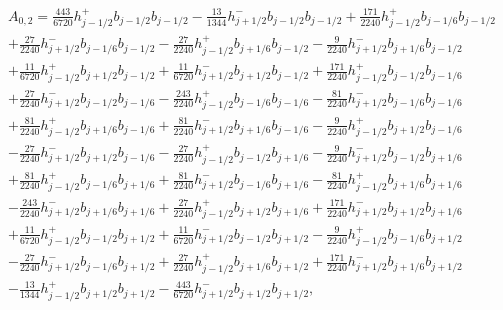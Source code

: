 \documentclass[12pt]{article}
\begin{document}
\begin{multline*} A_{0,2} = \frac{443}{6720} h_{j-1/2}^+ b_{j-1/2} b_{j-1/2}-\frac{13}{1344} h_{j+1/2}^- b_{j-1/2} b_{j-1/2}+\frac{171}{2240} h_{j-1/2}^+ b_{j-1/6} b_{j-1/2}\\+\frac{27}{2240} h_{j+1/2}^- b_{j-1/6} b_{j-1/2}-\frac{27}{2240} h_{j-1/2}^+ b_{j+1/6} b_{j-1/2}-\frac{9}{2240} h_{j+1/2}^- b_{j+1/6} b_{j-1/2}\\+\frac{11}{6720} h_{j-1/2}^+ b_{j+1/2} b_{j-1/2}+\frac{11}{6720} h_{j+1/2}^- b_{j+1/2} b_{j-1/2}+\frac{171}{2240} h_{j-1/2}^+ b_{j-1/2} b_{j-1/6}\\+\frac{27}{2240} h_{j+1/2}^- b_{j-1/2} b_{j-1/6}-\frac{243}{2240} h_{j-1/2}^+ b_{j-1/6} b_{j-1/6}-\frac{81}{2240} h_{j+1/2}^- b_{j-1/6} b_{j-1/6}\\+\frac{81}{2240} h_{j-1/2}^+ b_{j+1/6} b_{j-1/6}+\frac{81}{2240} h_{j+1/2}^- b_{j+1/6} b_{j-1/6}-\frac{9}{2240} h_{j-1/2}^+ b_{j+1/2} b_{j-1/6}\\-\frac{27}{2240} h_{j+1/2}^- b_{j+1/2} b_{j-1/6}-\frac{27}{2240} h_{j-1/2}^+ b_{j-1/2} b_{j+1/6}-\frac{9}{2240} h_{j+1/2}^- b_{j-1/2} b_{j+1/6}\\+\frac{81}{2240} h_{j-1/2}^+ b_{j-1/6} b_{j+1/6}+\frac{81}{2240} h_{j+1/2}^- b_{j-1/6} b_{j+1/6}-\frac{81}{2240} h_{j-1/2}^+ b_{j+1/6} b_{j+1/6}\\-\frac{243}{2240} h_{j+1/2}^- b_{j+1/6} b_{j+1/6}+\frac{27}{2240} h_{j-1/2}^+ b_{j+1/2} b_{j+1/6}+\frac{171}{2240} h_{j+1/2}^- b_{j+1/2} b_{j+1/6}\\+\frac{11}{6720} h_{j-1/2}^+ b_{j-1/2} b_{j+1/2}+\frac{11}{6720} h_{j+1/2}^- b_{j-1/2} b_{j+1/2}-\frac{9}{2240} h_{j-1/2}^+ b_{j-1/6} b_{j+1/2}\\-\frac{27}{2240} h_{j+1/2}^- b_{j-1/6} b_{j+1/2}+\frac{27}{2240} h_{j-1/2}^+ b_{j+1/6} b_{j+1/2}+\frac{171}{2240} h_{j+1/2}^- b_{j+1/6} b_{j+1/2}\\-\frac{13}{1344} h_{j-1/2}^+ b_{j+1/2} b_{j+1/2}-\frac{443}{6720} h_{j+1/2}^- b_{j+1/2} b_{j+1/2}, \end{multline*}
\end{document}
